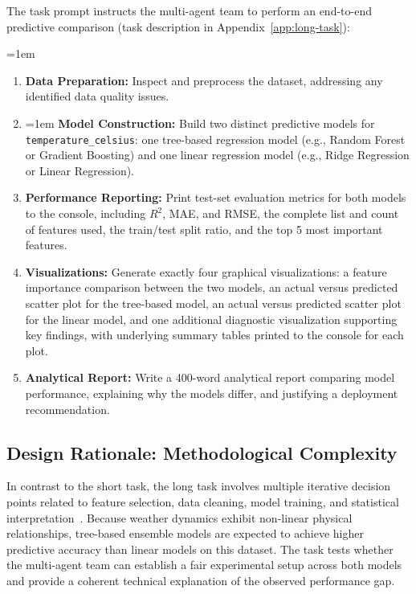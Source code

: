 The task prompt instructs the multi-agent team to perform an end-to-end predictive comparison (task description in Appendix~\ref{app:long-task}):
{
\emergencystretch=1em
\begin{enumerate}
    \item \textbf{Data Preparation:} Inspect and preprocess the dataset, addressing any identified data quality issues.
    \item {
    \emergencystretch=1em
    \textbf{Model Construction:} Build two distinct predictive models for \texttt{temperature\_\allowbreak celsius}:
    one tree-based regression model (e.g., Random Forest or Gradient Boosting) and one linear regression model (e.g., Ridge Regression or Linear Regression).\par}
    \item \textbf{Performance Reporting:} Print test-set evaluation metrics for both models to the console, including $R^2$, \ac{MAE}, and \ac{RMSE}, the complete list and count of features used, the train/test split ratio, and the top 5 most important features.
    \item \textbf{Visualizations:} Generate exactly four graphical visualizations:
    a feature importance comparison between the two models,
    an actual versus predicted scatter plot for the tree-based model,
    an actual versus predicted scatter plot for the linear model,
    and one additional diagnostic visualization supporting key findings,
    with underlying summary tables printed to the console for each plot.
    \item \textbf{Analytical Report:} Write a 400-word analytical report comparing model performance, explaining why the models differ, and justifying a deployment recommendation.
\end{enumerate}}

\subsection{Design Rationale: Methodological Complexity}
\label{subsec:long-task-design-rationale}

In contrast to the short task, the long task involves multiple iterative decision points related to feature selection, data cleaning, model training, and statistical interpretation~\cite{yehudai2026surveyevaluationllmbasedagents, hong2024metagptmetaprogrammingmultiagent}.
Because weather dynamics exhibit non-linear physical relationships, tree-based ensemble models are expected to achieve higher predictive accuracy than linear models on this dataset.
The task tests whether the multi-agent team can establish a fair experimental setup across both models and provide a coherent technical explanation of the observed performance gap.

